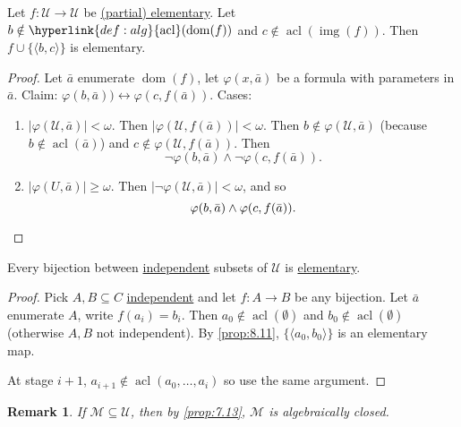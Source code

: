 \documentclass{article}
\DeclareMathOperator{\dom}{dom}
\DeclareMathOperator{\img}{img}
\DeclareMathOperator{\acl}{acl}
\newtheorem{nremark}[nthm]{Remark}
\newcommand{\M}{\mathcal{M}}
\newcommand{\U}{\mathcal{U}}
\begin{document}
\begin{nprop}\label{prop:8.11}
  Let $f: \mathcal{U} \to \mathcal{U}$ be \hyperlink{def:upe}{(partial) elementary}.
  Let $b \notin \hyperlink{def:alg}{\acl}(\dom(f))$ and $c \notin \acl(\img(f))$.
  Then $f \cup \{\langle b, c \rangle\}$ is elementary.
\end{nprop}
\begin{proof}
  Let $\bar{a}$ enumerate $\dom(f)$, let $\varphi(x, \bar{a})$ be a formula with parameters in $\bar{a}$.
  Claim: $\varphi(b,\bar{a})) \leftrightarrow \varphi(c, f(\bar{a}))$. Cases:
  \begin{enumerate}
  \item $|\varphi(\mathcal{U}, \bar{a})| < \omega$. Then $|\varphi(\mathcal{U}, f(\bar{a}))| < \omega$.
    Then $b \notin \varphi(\mathcal{U}, \bar{a})$ (because $b \notin \acl(\bar{a})$) and $c \notin \varphi(\mathcal{U}, f(\bar{a}))$.
    Then
    \begin{equation*}
      \lnot \varphi(b, \bar{a}) \land \neg \varphi(c, f(\bar{a})).
    \end{equation*}
  \item $|\varphi(U, \bar{a})| \geq \omega$. Then $|\neg \varphi(\mathcal{U}, \bar{a})| < \omega$, and so
    \begin{equation*}
      \varphi(b, \bar{a}) \land \varphi(c, f(\bar{a})). \qedhere
    \end{equation*}
  \end{enumerate}
\end{proof}
\begin{ncor}\label{cor:8.12}
  Every bijection between \hyperlink{def:indep}{independent} subsets of $\mathcal{U}$ is \hyperlink{def:upe}{elementary}.  \end{ncor}
\begin{proof}
  Pick $A,B \subseteq C$ \hyperlink{def:indep}{independent} and let $f: A \to B$ be any bijection.
  Let $\bar{a}$ enumerate $A$, write $f(a_i) = b_i$.
  Then $a_0 \notin \acl(\emptyset)$ and $b_0 \notin \acl(\emptyset)$ (otherwise $A,B$ not independent). By \cref{prop:8.11}, $\{\langle a_0, b_0 \rangle \}$ is an elementary map.

  At stage $i+1$, $a_{i+1} \notin \acl(a_0, \dotsc, a_i)$ so use the same argument.
\end{proof}

\begin{nremark}\label{rem:8.13}
If $\M \subseteq \U$, then by \cref{prop:7.13}, $\M$ is algebraically closed.
\end{nremark}
\end{document}
